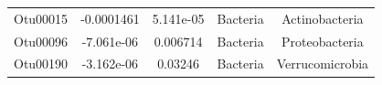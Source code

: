 \documentclass[]{article}
\begin{document}
\begin{longtable}[]{@{}ccccc@{}}
\begin{minipage}[t]{0.13\columnwidth}
Otu00015\strut
\end{minipage} & \begin{minipage}[t]{0.16\columnwidth}\centering\strut
-0.0001461\strut
\end{minipage} & \begin{minipage}[t]{0.14\columnwidth}\centering\strut
5.141e-05\strut
\end{minipage} & \begin{minipage}[t]{0.13\columnwidth}\centering\strut
Bacteria\strut
\end{minipage} & \begin{minipage}[t]{0.20\columnwidth}\centering\strut
Actinobacteria\strut
\end{minipage}\tabularnewline
\begin{minipage}[t]{0.13\columnwidth}\centering\strut
Otu00096\strut
\end{minipage} & \begin{minipage}[t]{0.16\columnwidth}\centering\strut
-7.061e-06\strut
\end{minipage} & \begin{minipage}[t]{0.14\columnwidth}\centering\strut
0.006714\strut
\end{minipage} & \begin{minipage}[t]{0.13\columnwidth}\centering\strut
Bacteria\strut
\end{minipage} & \begin{minipage}[t]{0.20\columnwidth}\centering\strut
Proteobacteria\strut
\end{minipage}\tabularnewline
\begin{minipage}[t]{0.13\columnwidth}\centering\strut
Otu00190\strut
\end{minipage} & \begin{minipage}[t]{0.16\columnwidth}\centering\strut
-3.162e-06\strut
\end{minipage} & \begin{minipage}[t]{0.14\columnwidth}\centering\strut
0.03246\strut
\end{minipage} & \begin{minipage}[t]{0.13\columnwidth}\centering\strut
Bacteria\strut
\end{minipage} & \begin{minipage}[t]{0.20\columnwidth}\centering\strut
Verrucomicrobia\strut
\end{minipage}\tabularnewline
\bottomrule
\end{longtable}
\end{document}
